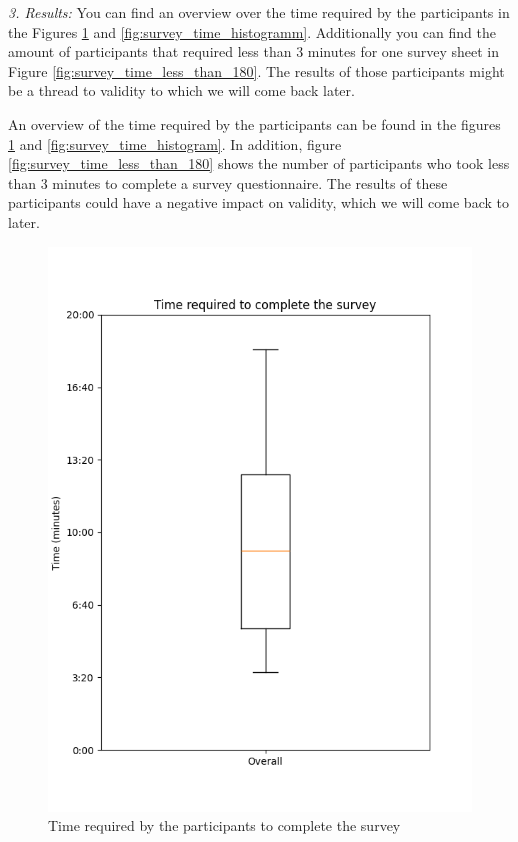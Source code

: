 \documentclass[%
class=scrreprt,
chapterprefix=false,%
open=right,%
twoside=false,%
paper=a4,%
logofile={Logo\_zentral\_farbig\_EN.png},%
thesistype=master,%
UKenglish,%
]{se2thesis}
\theoremstyle{definition}
\begin{document}
\textit{3. Results:}
	You can find an overview over the time required by the participants in the Figures \ref{fig:survey_time_box} and \ref{fig:survey_time_histogramm}. Additionally you can find the amount of participants that required less than 3 minutes for one survey sheet in Figure \ref{fig:survey_time_less_than_180}. The results of those participants might be a thread to validity to which we will come back later.
	
	An overview of the time required by the participants can be found in the figures \ref{fig:survey_time_box} and \ref{fig:survey_time_histogram}. In addition, figure \ref{fig:survey_time_less_than_180} shows the number of participants who took less than 3 minutes to complete a survey questionnaire. The results of these participants could have a negative impact on validity, which we will come back to later. 
	
	\begin{figure}[t]
		\centering
		\includegraphics[width=\textwidth]{img/survey_time_box.png}
		\caption{Time required by the participants to complete the survey}
		\label{fig:survey_time_box}
	\end{figure}
	
\end{document}
